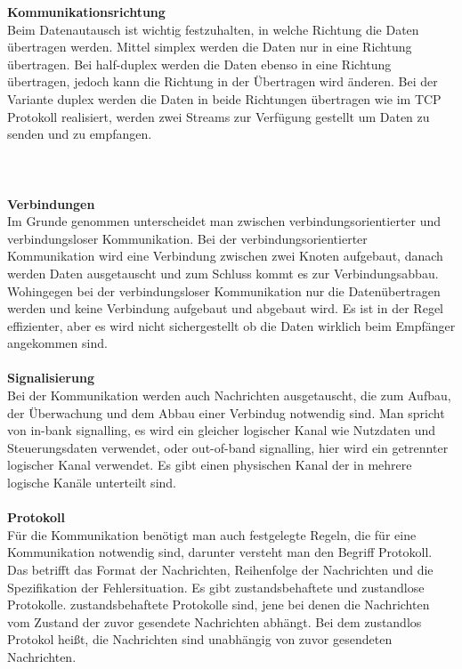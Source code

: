 \documentclass[a4paper,12pt]{article}
\begin{document}
\textbf{Kommunikationsrichtung\\}
Beim Datenautausch ist wichtig festzuhalten, in welche Richtung die Daten übertragen werden. Mittel simplex werden die Daten nur in eine Richtung übertragen. 
Bei half-duplex werden die Daten ebenso in eine Richtung übertragen, jedoch kann die Richtung in der Übertragen wird änderen. Bei der Variante duplex werden die Daten in beide Richtungen übertragen wie im TCP Protokoll realisiert, werden zwei Streams
zur Verfügung gestellt um Daten zu senden und zu empfangen.\\\\\\\\
\textbf{Verbindungen\\}
Im Grunde genommen unterscheidet man zwischen verbindungsorientierter und verbindungsloser Kommunikation. Bei der verbindungsorientierter Kommunikation wird eine Verbindung zwischen zwei Knoten aufgebaut, danach werden Daten ausgetauscht und zum Schluss kommt es zur
Verbindungsabbau. Wohingegen bei der verbindungsloser Kommunikation nur die Datenübertragen werden und keine Verbindung aufgebaut und abgebaut wird. Es ist in der Regel effizienter, aber es wird nicht sichergestellt ob die Daten wirklich beim Empfänger angekommen sind.\\ \\
\textbf{Signalisierung\\}
Bei der Kommunikation werden auch Nachrichten ausgetauscht, die zum Aufbau, der Überwachung und dem Abbau einer Verbindug notwendig sind. Man spricht von in-bank signalling, es wird ein gleicher logischer Kanal wie Nutzdaten und Steuerungsdaten verwendet, oder out-of-band signalling, hier wird ein getrennter logischer Kanal verwendet. Es gibt einen
physischen Kanal der in mehrere logische Kanäle unterteilt sind. \\ \\
\textbf{Protokoll\\}
Für die Kommunikation benötigt man auch festgelegte Regeln, die für eine Kommunikation notwendig sind, darunter versteht man den Begriff Protokoll. Das betrifft das Format der Nachrichten, Reihenfolge der Nachrichten und die Spezifikation der Fehlersituation. Es gibt zustandsbehaftete und zustandlose Protokolle. zustandsbehaftete Protokolle sind, jene bei denen die Nachrichten
vom Zustand der zuvor gesendete Nachrichten abhängt. Bei dem zustandlos Protokol heißt, die Nachrichten sind unabhängig von zuvor gesendeten Nachrichten.\\\\
\end{document}
